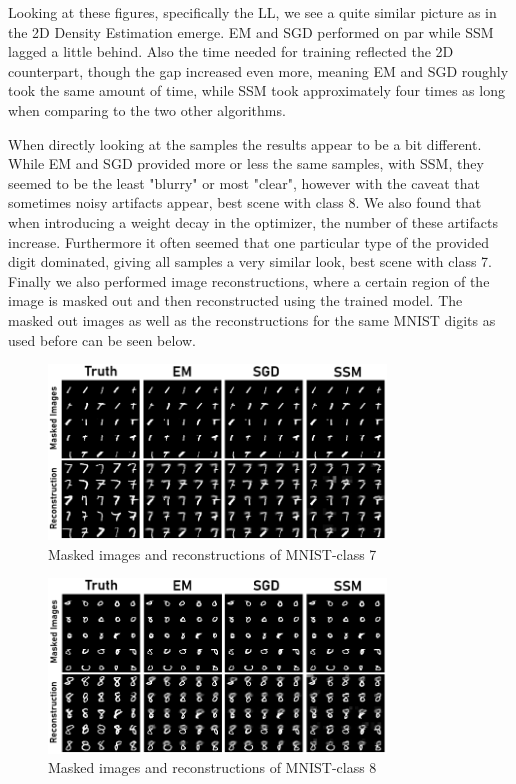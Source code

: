 Looking at these figures, specifically the LL, we see a quite similar picture as in the 2D Density Estimation emerge. 
EM and SGD performed on par while SSM lagged a little behind. 
Also the time needed for training reflected the 2D counterpart, though the gap increased even more, meaning EM and SGD roughly took the same amount of time, while SSM took approximately four times as long when comparing to the two other algorithms. 

When directly looking at the samples the results appear to be a bit different. While EM and SGD provided more or less the same samples, with SSM, they seemed to be the least "blurry" or most "clear", however with the caveat
that sometimes noisy artifacts appear, best scene with class 8. We also found that when introducing 
a weight decay in the optimizer, the number of these artifacts increase. Furthermore it often seemed that
one particular type of the provided digit dominated, giving all samples a very similar look, best scene with class 7. \\

Finally we also performed image reconstructions, where a certain region of the image is masked out and then reconstructed using the trained model.
The masked out images as well as the reconstructions for the same MNIST digits as used before can be seen below.

\begin{figure}[H]
    \centering
    \includegraphics[width=0.8\textwidth]{figures/einsum/mnist/reconstructions_7.png}
    \caption{Masked images and reconstructions of MNIST-class 7}
\end{figure}

\begin{figure}[H]
    \centering
    \includegraphics[width=0.8\textwidth]{figures/einsum/mnist/reconstructions_8.png}
    \caption{Masked images and reconstructions of MNIST-class 8}
\end{figure}

